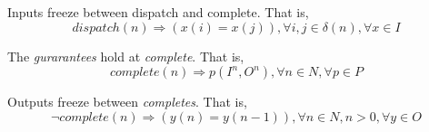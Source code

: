 Inputs freeze between dispatch and complete. That is,
\begin{equation} 
\label{eqn:inputfreeze}
dispatch(n) \Rightarrow (x(i) = x(j)), \forall i,j\in \delta(n), \forall x \in I
\end{equation}

The \emph{gurarantees} hold at \emph{complete}. That is,
\begin{equation} 
\label{eqn:guarantee}
complete(n) \Rightarrow p(I^n, O^n), \forall n\in N, \forall p \in P
\end{equation}

Outputs freeze between \emph{completes}. That is,
\begin{equation} 
\label{eqn:outputfreeze}
\lnot complete(n) \Rightarrow (y(n) = y(n-1)), \forall n \in N, n>0, \forall y \in O
\end{equation}



